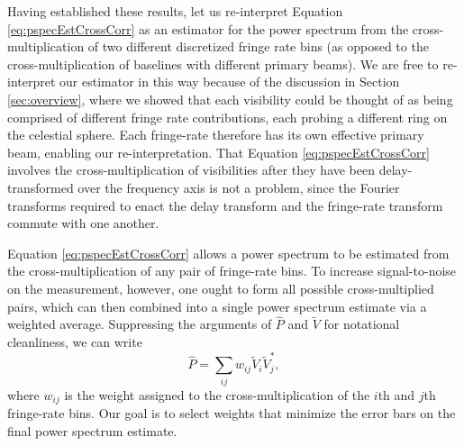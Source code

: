 \documentclass[twocolumn,apj,numberedappendix]{emulateapj}
\begin{document}
Having established these results, let us re-interpret Equation \eqref{eq:pspecEstCrossCorr} as an estimator for the power spectrum from the cross-multiplication of two different discretized fringe rate bins (as opposed to the cross-multiplication of baselines with different primary beams). We are free to re-interpret our estimator in this way because of the discussion in Section \ref{sec:overview}, where we showed that each visibility could be thought of as being comprised of different fringe rate contributions, each probing a different ring on the celestial sphere. Each fringe-rate therefore has its own effective primary beam, enabling our re-interpretation. That Equation \eqref{eq:pspecEstCrossCorr} involves the cross-multiplication of visibilities after they have been delay-transformed over the frequency axis is not a problem, since the Fourier transforms required to enact the delay transform and the fringe-rate transform commute with one another.

Equation \eqref{eq:pspecEstCrossCorr} allows a power spectrum to be estimated from the cross-multiplication of any pair of fringe-rate bins. To increase signal-to-noise on the measurement, however, one ought to form all possible cross-multiplied pairs, which can then combined into a single power spectrum estimate via a weighted average. Suppressing the arguments of $\widehat{P}$ and $\widetilde{V}$ for notational cleanliness, we can write
\begin{equation}
\label{eq:wVV}
\widehat{P} = \sum_{ij} w_{ij} \widetilde{V}_i \widetilde{V}_j^*,
\end{equation}
where $w_{ij}$ is the weight assigned to the cross-multiplication of the $i$th and $j$th fringe-rate bins. Our goal is to select weights that minimize the error bars on the final power spectrum estimate. 
\end{document}
